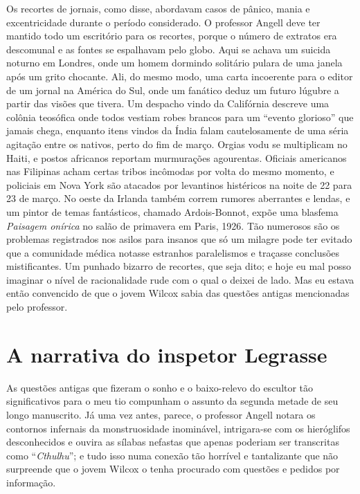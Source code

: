 Os recortes de jornais, como disse, abordavam casos de pânico, mania e
excentricidade durante o período considerado. O professor Angell deve
ter mantido todo um escritório para os recortes, porque o número de
extratos era descomunal e as fontes se espalhavam pelo globo. Aqui se
achava um suicida noturno em Londres, onde um homem dormindo solitário
pulara de uma janela após um grito chocante. Ali, do mesmo modo, uma
carta incoerente para o editor de um jornal na América do Sul, onde um
fanático deduz um futuro lúgubre a partir das visões que tivera. Um
despacho vindo da Califórnia descreve uma colônia teosófica onde todos
vestiam robes brancos para um ``evento glorioso'' que jamais chega,
enquanto itens vindos da Índia falam cautelosamente de uma séria
agitação entre os nativos, perto do fim de março. Orgias vodu se
multiplicam no Haiti, e postos africanos reportam murmurações
agourentas. Oficiais americanos nas Filipinas acham certas tribos
incômodas por volta do mesmo momento, e policiais em Nova York são
atacados por levantinos histéricos na noite de 22 para 23 de março. No
oeste da Irlanda também correm rumores aberrantes e lendas, e um pintor
de temas fantásticos, chamado Ardois-Bonnot, expõe uma blasfema
\emph{Paisagem onírica} no salão de primavera em Paris, 1926. Tão numerosos
são os problemas registrados nos asilos para insanos que só um milagre
pode ter evitado que a comunidade médica notasse estranhos paralelismos
e traçasse conclusões mistificantes. Um punhado bizarro de recortes, que
seja dito; e hoje eu mal posso imaginar o nível de racionalidade rude
com o qual o deixei de lado. Mas eu estava então convencido de que o jovem
Wilcox sabia das questões antigas mencionadas pelo professor.

\clearpage
\thispagestyle{empty}
\null\clearpage %

\chapter{A narrativa do inspetor Legrasse}

\noindent{}As questões antigas que fizeram o sonho e o baixo-relevo do escultor tão
significativos para o meu tio compunham o assunto da segunda metade de
seu longo manuscrito. Já uma vez antes, parece, o professor Angell
notara os contornos infernais da monstruosidade inominável, intrigara-se
com os hieróglifos desconhecidos e ouvira as sílabas nefastas que apenas
poderiam ser transcritas como ``\emph{Cthulhu}''; e tudo isso numa
conexão tão horrível e tantalizante que não surpreende que o
jovem Wilcox o tenha procurado com questões e pedidos por informação.

